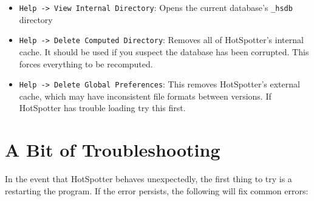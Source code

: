 \documentclass[a4paper,10pt]{article}
\begin{document}
\begin{itemize}
\item \verb+Help -> View Internal Directory+: 
    Opens the current database's {\tt \_hsdb} directory

\item \verb+Help -> Delete Computed Directory+: 
    Removes all of HotSpotter's internal cache. It should be used if you suspect
    the database has been corrupted. This forces everything to be recomputed. 

\item \verb+Help -> Delete Global Preferences+: 
    This removes HotSpotter's  external cache, which may have inconsistent
    file formats between versions. If HotSpotter has trouble loading try this
    first. 



\end{itemize}
  


\section{A Bit of Troubleshooting}

In the event that HotSpotter behaves unexpectedly, the first thing to try is a
restarting the program. If the error persists, the following will fix common
errors: 
\end{document}
